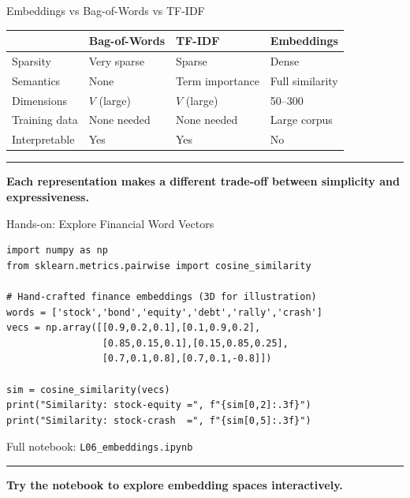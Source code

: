 \documentclass[8pt,aspectratio=169]{beamer}
\newcommand{\bottomnote}[1]{%
\vfill
\vspace{-2mm}
\textcolor{mllavender2}{\rule{\textwidth}{0.4pt}}
\vspace{1mm}
\footnotesize
\textbf{#1}
}
\begin{document}
\begin{frame}{Embeddings vs Bag-of-Words vs TF-IDF}
\small
\begin{tabular}{p{2.5cm}p{3cm}p{3cm}p{3cm}}
\toprule
& \textbf{Bag-of-Words} & \textbf{TF-IDF} & \textbf{Embeddings} \\
\midrule
Sparsity & Very sparse & Sparse & Dense \\
Semantics & None & Term importance & Full similarity \\
Dimensions & $V$ (large) & $V$ (large) & 50--300 \\
Training data & None needed & None needed & Large corpus \\
Interpretable & Yes & Yes & No \\
\bottomrule
\end{tabular}

\bottomnote{Each representation makes a different trade-off between simplicity and expressiveness.}
\end{frame}

\begin{frame}[fragile]{Hands-on: Explore Financial Word Vectors}
\small
\begin{verbatim}
import numpy as np
from sklearn.metrics.pairwise import cosine_similarity

# Hand-crafted finance embeddings (3D for illustration)
words = ['stock','bond','equity','debt','rally','crash']
vecs = np.array([[0.9,0.2,0.1],[0.1,0.9,0.2],
                 [0.85,0.15,0.1],[0.15,0.85,0.25],
                 [0.7,0.1,0.8],[0.7,0.1,-0.8]])

sim = cosine_similarity(vecs)
print("Similarity: stock-equity =", f"{sim[0,2]:.3f}")
print("Similarity: stock-crash  =", f"{sim[0,5]:.3f}")
\end{verbatim}
\vspace{2pt}
\small Full notebook: \texttt{L06\_embeddings.ipynb}

\bottomnote{Try the notebook to explore embedding spaces interactively.}
\end{frame}
\end{document}
